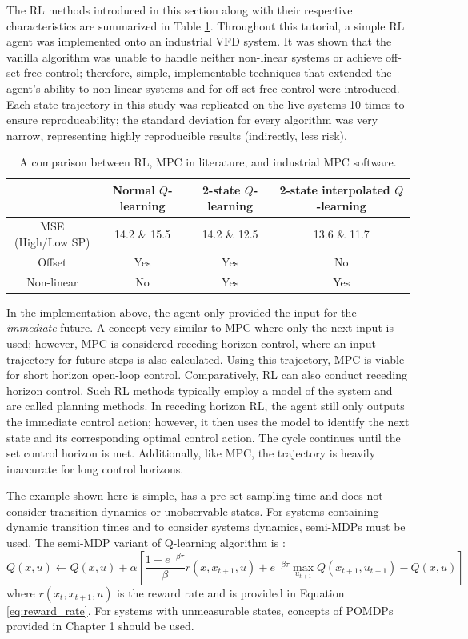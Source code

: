 The RL methods introduced in this section along with their respective characteristics are summarized in Table \ref{tab:system1_info}. Throughout this tutorial, a simple RL agent was implemented onto an industrial VFD system. It was shown that the vanilla algorithm was unable to handle neither non-linear systems or achieve off-set free control; therefore, simple, implementable techniques that extended the agent's ability to non-linear systems and for off-set free control were introduced. Each state trajectory in this study was replicated on the live systems 10 times to ensure reproducability; the standard deviation for every algorithm was very narrow, representing highly reproducible results (indirectly, less risk).

\begin{table}[H]
\caption{A comparison between RL, MPC in literature, and industrial MPC software.}
\label{tab:system1_info}
\centering
{\scriptsize
\begin{tabular}{c|c|c|c}
 & \textbf{Normal $Q$-learning}	& \textbf{2-state $Q$-learning} & \textbf{2-state interpolated $Q$-learning}\\
 \hline
MSE (High/Low SP)   & 14.2 \& 15.5	& 14.2 \& 12.5   &  13.6 \& 11.7 \\
Offset		& Yes			&  Yes   &  No \\
Non-linear		& No			& Yes   &  Yes \\
\end{tabular}}
\end{table}

In the implementation above, the agent only provided the input for the \textit{immediate} future. A concept very similar to MPC where only the next input is used; however, MPC is considered receding horizon control, where an input trajectory for future steps is also calculated.  Using this trajectory, MPC is viable for short horizon open-loop control.  Comparatively, RL can also conduct receding horizon control. Such RL methods typically employ a model of the system and are called planning methods.  In receding horizon RL, the agent still only outputs the immediate control action; however, it then uses the model to identify the next state and its corresponding optimal control action. The cycle continues until the set control horizon is met.  Additionally, like MPC, the trajectory is heavily inaccurate for long control horizons.

The example shown here is simple, has a pre-set sampling time and does not consider transition dynamics or unobservable states. For systems containing dynamic transition times and to consider systems dynamics, semi-MDPs must be used.  The semi-MDP variant of Q-learning algorithm is \cite{continuous_rl_ref14}:
\begin{equation}
    Q(x, u) \leftarrow Q(x, u) + \alpha \left[\frac{1 - e^{-\beta \tau}}{\beta}r(x, x_{t+1}, u) + e^{-\beta \tau} \max_{u_{t+1}}Q(x_{t+1}, u_{t+1}) - Q(x, u) \right]
\end{equation}
where $r(x_t, x_{t+1}, u)$ is the reward rate and is provided in Equation \ref{eq:reward_rate}. For systems with unmeasurable states, concepts of POMDPs provided in Chapter 1 should be used.

